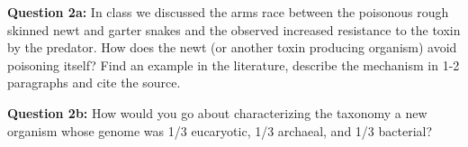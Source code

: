 \documentclass[12pt]{article}    %
\begin{document}
\noindent

\textbf{Question 2a:} In class we discussed the arms race between the poisonous
rough skinned newt and garter snakes and the observed increased resistance to
the toxin by the predator. How does the newt (or another toxin producing
organism) avoid poisoning itself? Find an example in the literature, describe
the mechanism in 1-2 paragraphs and cite the source.

\vspace{5mm}
\textbf{Question 2b:} How would you go about characterizing the taxonomy a new
organism whose genome was 1/3 eucaryotic, 1/3 archaeal, and 1/3 bacterial?

%
%
%
%
%
\end{document}
